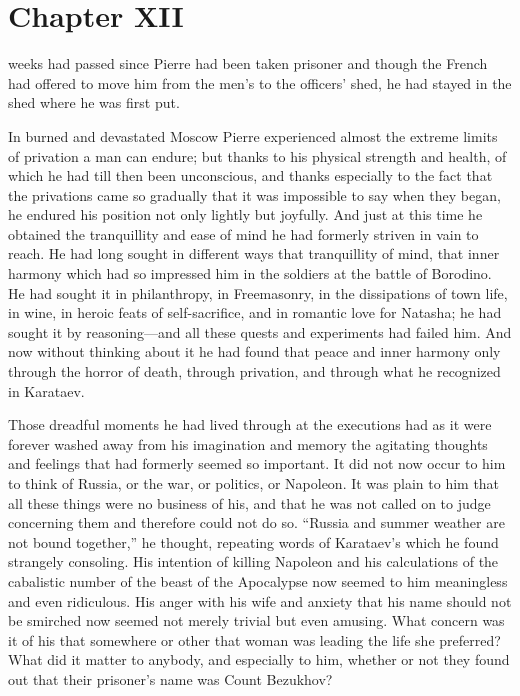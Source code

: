 \chapter*{Chapter XII} \ifaudio {}
\fi

 weeks had passed since Pierre had been taken prisoner and
though the French had offered to move him from the men's to the
officers' shed, he had stayed in the shed where he was first put.

In burned and devastated Moscow Pierre experienced almost the
extreme limits of privation a man can endure; but thanks to his
physical strength and health, of which he had till then been
unconscious, and thanks especially to the fact that the
privations came so gradually that it was impossible to say when
they began, he endured his position not only lightly but
joyfully. And just at this time he obtained the tranquillity and
ease of mind he had formerly striven in vain to reach.  He had
long sought in different ways that tranquillity of mind, that
inner harmony which had so impressed him in the soldiers at the
battle of Borodino. He had sought it in philanthropy, in
Freemasonry, in the dissipations of town life, in wine, in heroic
feats of self-sacrifice, and in romantic love for Natasha; he had
sought it by reasoning---and all these quests and experiments had
failed him. And now without thinking about it he had found that
peace and inner harmony only through the horror of death, through
privation, and through what he recognized in Karataev.

Those dreadful moments he had lived through at the executions had
as it were forever washed away from his imagination and memory
the agitating thoughts and feelings that had formerly seemed so
important. It did not now occur to him to think of Russia, or the
war, or politics, or Napoleon. It was plain to him that all these
things were no business of his, and that he was not called on to
judge concerning them and therefore could not do so. ``Russia and
summer weather are not bound together,'' he thought, repeating
words of Karataev's which he found strangely consoling. His
intention of killing Napoleon and his calculations of the
cabalistic number of the beast of the Apocalypse now seemed to
him meaningless and even ridiculous. His anger with his wife and
anxiety that his name should not be smirched now seemed not
merely trivial but even amusing. What concern was it of his that
somewhere or other that woman was leading the life she preferred?
What did it matter to anybody, and especially to him, whether or
not they found out that their prisoner's name was Count Bezukhov?


